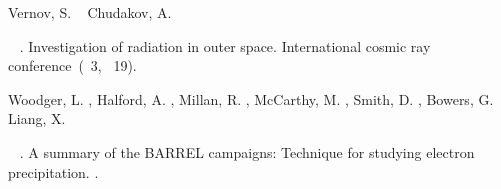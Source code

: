 \documentclass[draft]{agujournal2019}
\begin{document}
\begin{thebibliography}{}
%
\begin{APACrefauthors}%
Vernov, S.%
\BCBT {}\ \BBA {} Chudakov, A.%
\end{APACrefauthors}%
\unskip\
\newblock
{}.
\newblock
{\BBOQ}
  {Investigation of radiation in outer space}.{\BBCQ}
\newblock
\BIn{}  {International
  cosmic ray conference}\ (\BVOL~3, \BPG~19).
\PrintBackRefs{\CurrentBib}

%
\begin{APACrefauthors}%
Woodger, L.%
, Halford, A.%
, Millan, R.%
, McCarthy, M.%
, Smith, D.%
, Bowers, G.%
\BDBL {}Liang, X.%
\end{APACrefauthors}%
\unskip\
\newblock
{}.
\newblock
{\BBOQ} {A summary of the {BARREL} campaigns:
  Technique for studying electron precipitation}.{\BBCQ}
\newblock
{}.
\PrintBackRefs{\CurrentBib}

\end{thebibliography}
\end{document}
